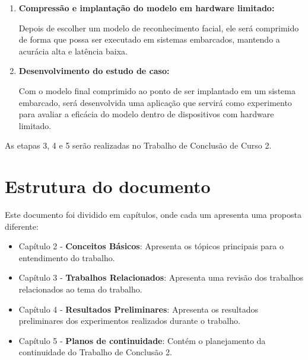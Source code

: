 \begin{enumerate}
	\item \textbf{Compressão e implantação do modelo em hardware limitado:}

		Depois de escolher um modelo de reconhecimento facial, ele será comprimido de forma que possa ser executado
		em sistemas embarcados, mantendo a acurácia alta e latência baixa.

	\item \textbf{Desenvolvimento do estudo de caso:}

		Com o modelo final comprimido ao ponto de ser implantado em um sistema embarcado, será desenvolvida uma aplicação 	 	 que servirá como experimento para avaliar a eficácia do modelo dentro de dispositivos com hardware limitado.

\end{enumerate}

As etapas 3, 4 e 5 serão realizadas no Trabalho de Conclusão de Curso 2.

\section{Estrutura do documento}
Este documento foi dividido em capítulos, onde cada um apresenta uma proposta diferente:
\begin{itemize}
	\item Capítulo 2 - \textbf{Conceitos Básicos}: Apresenta os tópicos principais para o entendimento
		do trabalho.
	\item Capítulo 3 - \textbf{Trabalhos Relacionados}: Apresenta uma revisão dos trabalhos
		relacionados ao tema do trabalho.
	\item Capítulo 4 - \textbf{Resultados Preliminares}: Apresenta os resultados preliminares dos
		experimentos realizados durante o trabalho.
	\item Capítulo 5 - \textbf{Planos de continuidade}: Contém o planejamento da continuidade do
		Trabalho de Conclusão 2.
\end{itemize}
